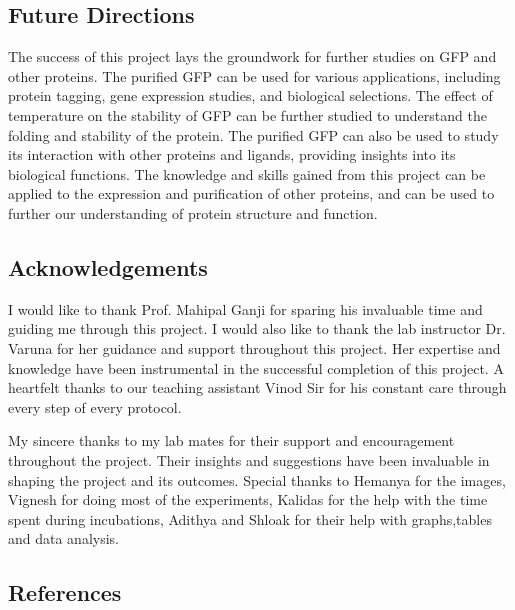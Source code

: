 \documentclass[twoside]{article}
\begin{document}
\begin{multicols}{2}
\subsection*{Future Directions}
The success of this project lays the groundwork for further studies on GFP and other proteins.
The purified GFP can be used for various applications, including protein tagging, gene expression studies, and biological selections.
The effect of temperature on the stability of GFP can be further studied to understand the folding and stability of the protein.
The purified GFP can also be used to study its interaction with other proteins and ligands, providing insights into its biological functions.
The knowledge and skills gained from this project can be applied to the expression and purification of other proteins,
and can be used to further our understanding of protein structure and function.


\subsection*{Acknowledgements}
I would like to thank Prof. Mahipal Ganji for sparing his invaluable time and guiding me through this project.
I would also like to thank the lab instructor Dr. Varuna for her guidance and support throughout this project.
Her expertise and knowledge have been instrumental in the successful completion of this project.
A heartfelt thanks to our teaching assistant Vinod Sir for his constant care through every step of every protocol.

My sincere thanks to my lab mates for their support and encouragement throughout the project.
Their insights and suggestions have been invaluable in shaping the project and its outcomes.
Special thanks to Hemanya for the images, Vignesh for doing most of the experiments, Kalidas for the help with the time spent during incubations,
Adithya and Shloak for their help with graphs,tables and data analysis.

\subsection*{References}


\end{multicols}
\end{document}
